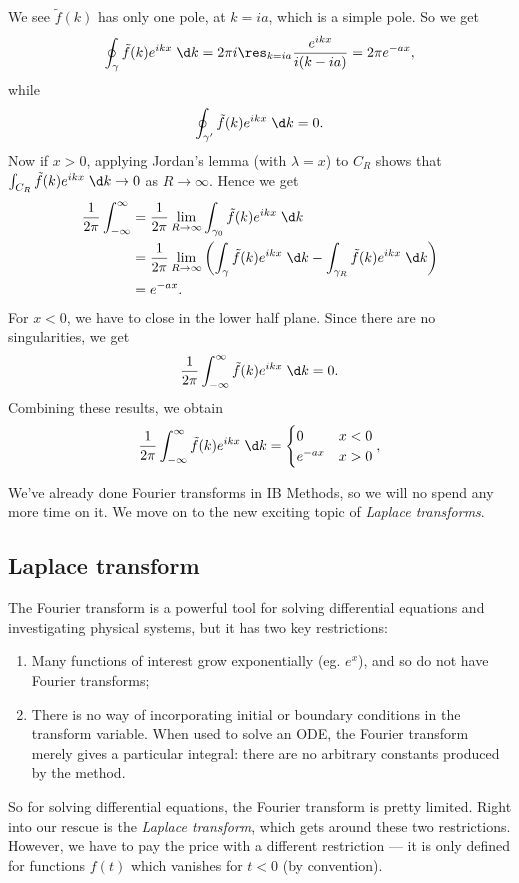 \documentclass[a4paper]{article}
\begin{document}
\begin{eg}
\begin{center}
  \end{center}
  We see $\tilde{f}(k)$ has only one pole, at $k = ia$, which is a simple pole. So we get
  \[
    \oint_\gamma \tilde{f}(k) e^{ikx} \;\d k = 2\pi i \res_{k = ia} \frac{e^{ikx}}{i(k - ia)} = 2\pi e^{-ax},
  \]
  while
  \[
    \oint_{\gamma'}\tilde{f}(k) e^{ikx} \;\d k = 0.
  \]
  Now if $x > 0$, applying Jordan's lemma (with $\lambda = x$) to $C_R$ shows that $\int_{C_R} \tilde{f}(k) e^{ikx}\;\d k \to 0$ as $R \to \infty$. Hence we get
  \begin{align*}
    \frac{1}{2\pi} \int_{-\infty}^\infty &= \frac{1}{2\pi} \lim_{R \to \infty}\int_{\gamma_0}\tilde{f}(k) e^{ikx}\;\d k\\
    &= \frac{1}{2\pi} \lim_{R \to \infty}\left(\int_\gamma\tilde{f}(k) e^{ikx}\;\d k - \int_{\gamma_R}\tilde{f}(k) e^{ikx}\;\d k\right)\\
    &= e^{-ax}.
  \end{align*}
  For $x < 0$, we have to close in the lower half plane. Since there are no singularities, we get
  \[
    \frac{1}{2\pi} \int_{-\infty}^\infty \tilde{f}(k) e^{ikx}\;\d k = 0.
  \]
  Combining these results, we obtain
  \[
    \frac{1}{2\pi} \int_{-\infty}^\infty \tilde{f}(k) e^{ikx}\;\d k =
    \begin{cases}
      0 & x < 0\\
      e^{-ax} & x > 0
    \end{cases},
  \]
\end{eg}
We've already done Fourier transforms in IB Methods, so we will no spend any more time on it. We move on to the new exciting topic of \emph{Laplace transforms}.

\subsection{Laplace transform}
The Fourier transform is a powerful tool for solving differential equations and investigating physical systems, but it has two key restrictions:
\begin{enumerate}
  \item Many functions of interest grow exponentially (eg. $e^x$), and so do not have Fourier transforms;
  \item There is no way of incorporating initial or boundary conditions in the transform variable. When used to solve an ODE, the Fourier transform merely gives a particular integral: there are no arbitrary constants produced by the method.
\end{enumerate}
So for solving differential equations, the Fourier transform is pretty limited. Right into our rescue is the \emph{Laplace transform}, which gets around these two restrictions. However, we have to pay the price with a different restriction --- it is only defined for functions $f(t)$ which vanishes for $t < 0$ (by convention).
\end{document}
